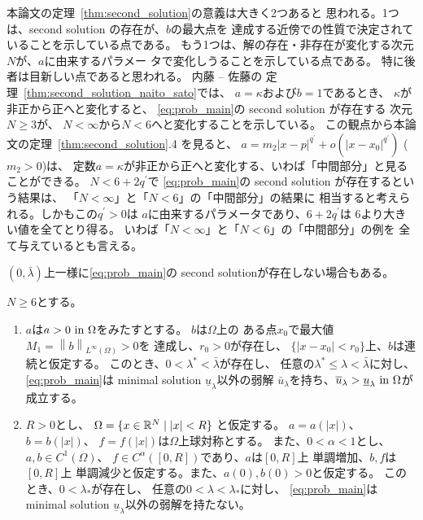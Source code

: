 本論文の定理~\ref{thm:second_solution}の意義は大きく2つあると
思われる。1つは、second solution の存在が、$b$の最大点を
達成する近傍での性質で決定されていることを示している点である。
もう1つは、解の存在・非存在が変化する次元$N$が、$a$に由来するパラメー
タで変化しうることを示している点である。
特に後者は目新しい点であると思われる。
内藤 -- 佐藤の
定理~\ref{thm:second_solution_naito_sato}では、
$a = \kappa$および$b = 1$であるとき、
$\kappa$が非正から正へと変化すると、
\ref{eq:prob_main}の second solution が存在する
次元$N \geq 3$が、
$N < \infty$から$N < 6$へと変化することを示している。
この観点から本論文の定理~\ref{thm:second_solution}.4 を見ると、
$a = m_2 \lvert x - p \rvert^{q^\prime} + o(\lvert x-x_0
\rvert^{q^\prime})$ ($m_2 > 0$)は、
定数$a = \kappa$が非正から正へと変化する、いわば「中間部分」と見ることができる。
$N < 6 + 2q^\prime$で
\ref{eq:prob_main}の second solution が存在するという結果は、
「$N < \infty$」と「$N < 6$」の「中間部分」の結果に
相当すると考えられる。しかもこの$q^\prime > 0$は
$a$に由来するパラメータであり、$6 + 2q^\prime$は
$6$より大きい値を全てとり得る。
いわば「$N < \infty$」と「$N < 6$」の「中間部分」の例を
全て与えているとも言える。

$(0, \bar{\lambda})$上一様に\ref{eq:prob_main}の
second solutionが存在しない場合もある。

\begin{thm} \label{thm:second_solution_nonex}
 $N \geq 6$とする。
 \begin{enumerate}[1.]  \sage
  \item $a$は$a > 0 ~\text{in}~ \Omega$をみたすとする。
        $b$は$\Omega$上の
        ある点$x_0$で最大値
        $M_1 = \left\| b \right\|_{L^\infty(\Omega)} > 0$を
        達成し、$r_0 > 0$が存在し、
        $\{ \lvert x - x_0 \rvert < r_0 \}$上、$b$は連続と仮定する。
        このとき、$0 < \lambda^* < \bar{\lambda}$が存在し、
        任意の$\lambda^* \leq
        \lambda < \bar{\lambda}$に対し、\ref{eq:prob_main}は
        minimal solution $\underline{u}_\lambda$以外の弱解
        $\bar{u}_\lambda$を持ち、$\overline{u}_\lambda >
        \underline{u}_\lambda ~\text{in}~ \Omega$が成立する。
  \item $R > 0$とし、
        $\Omega = \{ x \in \mathbb{R}^N \mid \lvert x \rvert < R\}$
        と仮定する。
        $a = a(\lvert x \rvert)$、
        $b = b(\lvert x \rvert)$、
        $f = f(\lvert x \rvert)$は$\Omega$上球対称とする。
        また、$0 < \alpha < 1$とし、$a , b \in C^1(\Omega)$、
        $f \in C^\alpha([0, R])$であり、$a$は$[0, R]$上
        単調増加、$b, f$は$[0, R]$上
        単調減少と仮定する。また、$a(0), b(0) > 0$と仮定する。
        このとき、$0 < \lambda_*$が存在し、
        任意の$0 < \lambda < \lambda_*$に対し、
        \ref{eq:prob_main}は
        minimal solution $\underline{u}_\lambda$以外の弱解を持たない。
 \end{enumerate}
\end{thm}

